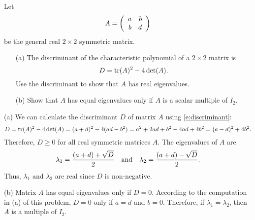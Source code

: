 \documentclass{ximera}
\begin{document}
\begin{exercise} \label{c7.7.1}
Let
\[
A = \left(\begin{array}{rr} a & b\\ b &d\end{array}\right)
\]
be the general real $2\times 2$ symmetric matrix.
\begin{itemize}
\item[(a)]  The discriminant of the characteristic polynomial of a $2\times 2$ matrix is
\[ 
D = {\rm tr}(A)^2 - 4\det(A). 
\]
Use the discriminant to show that $A$ has real eigenvalues.
\item[(b)]  Show that $A$ has equal eigenvalues only if $A$ is a scalar
multiple of $I_2$.
\end{itemize}

\begin{solution}
\soln
(a) We can calculate the discriminant $D$ of matrix $A$ using
\eqref{e:discriminant}:
\[ 
D = {\rm tr}(A)^2 - 4\det(A) = (a + d)^2 - 4(ad - b^2) =
a^2 + 2ad + b^2 - 4ad + 4b^2 = (a - d)^2 + 4b^2. 
\]
Therefore, $D \geq 0$ for all real symmetric matrices $A$.  The
eigenvalues of $A$ are
\[ \lambda_1 = \frac{(a + d) + \sqrt{D}}{2} \quad\mbox{and}\quad
\lambda_2 = \frac{(a + d) - \sqrt{D}}{2}. \]
Thus, $\lambda_1$ and $\lambda_2$ are real since $D$ is non-negative.

(b) Matrix $A$ has equal eigenvalues only if $D = 0$.  According to
the computation in (a) of this problem, $D = 0$ only if $a = d$ and
$b = 0$.  Therefore, if $\lambda_1 = \lambda_2$, then $A$ is a
multiple of $I_2$.

\end{solution}
\end{exercise}
\end{document}
